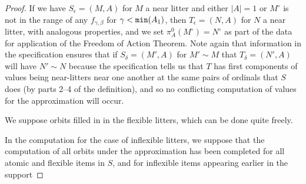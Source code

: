 \documentclass[112pt]{article}
\theoremstyle{definition}
\theoremstyle{remark}
\newcommand{\rk}[1]{{\color{blue}\sl #1}}
\begin{document}
\begin{proof}
If we have $S_\epsilon = (M,A)$ for $M$ a near litter and either $|A|=1$ or $M^\circ$ is not in the range of any $f_{\gamma,\beta}$ for $\gamma<{\tt min}(A_1)$, then $T_\epsilon = (N,A)$ for $N$ a near litter, with analogous properties, and we set $\pi^0_A(M^\circ) = N^\circ$  as part of the data for application of the Freedom of Action Theorem.    Note again
that information in the specification ensures that if $S_\delta = (M',A)$  for $M'\sim M$ that
$T_\delta = (N',A)$ will have $N' \sim N$ because the specification tells us that $T$ has first components of values being {near-}litters near one another at the same pairs of ordinals that $S$ does {(by parts 2--4 of the definition)},
and so no conflicting computation of values for the approximation will occur.

We suppose orbits filled in in the flexible litters, which can be done quite freely.

In the computation for the case of inflexible litters, we suppose that the computation of all orbits under the approximation has been completed for all atomic and flexible items in $S$, and for inflexible items appearing earlier in the support %


\end{proof}
\end{document}
